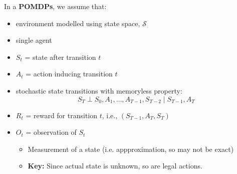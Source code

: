 \begin{summary}
    In a \textbf{POMDPs}, we assume that: 
    \begin{itemize}
        \item environment modelled using state space, $\mathcal{S}$
        \item single agent
        \item $S_t$ = state after transition $t$
        \item $A_t$ = action inducing transition $t$
        \item stochastic state transitions with memoryless property:
        \[
        S_T \perp S_0, A_1, \dots, A_{T-1}, S_{T-2} \mid S_{T-1}, A_T
        \]
        \item $R_t$ = reward for transition $t$, i.e., $(S_{T-1}, A_T, S_T)$
        \item $O_t$ = observation of $S_t$
        \begin{itemize}
            \item Measurement of a state (i.e. appproximation, so may not be exact)
            \item \textbf{Key:} Since actual state is unknown, so are legal actions. 
        \end{itemize}
    \end{itemize}
    \vspace{1em}


\end{summary}
